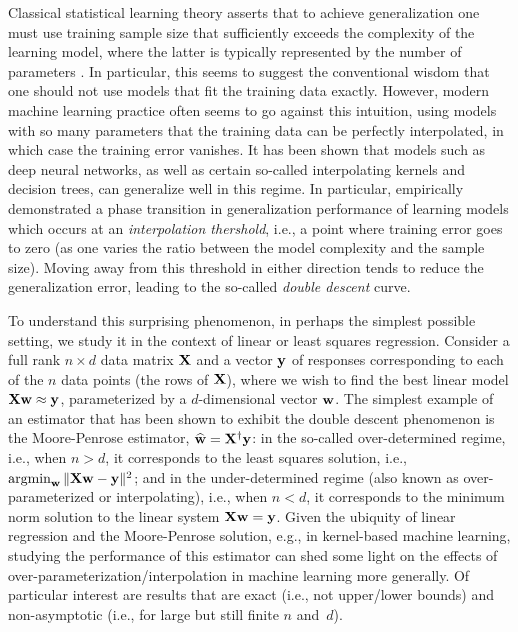 \documentclass[../../thesis.tex]{subfiles}
\begin{document}
Classical statistical learning theory asserts that to achieve generalization
one must use training sample size that sufficiently exceeds the complexity of
the learning model, where the latter is typically represented by the number of
parameters \citep[or some related structural parameter; see][]{HFT09}.  In particular,
this seems to suggest the conventional wisdom that one should not use models
that fit the training data exactly.  However, modern machine learning practice
often seems to go against this intuition, using models with so many parameters
that the training data can be perfectly interpolated, in which case the
training error vanishes. It has been shown that models such as deep neural
networks, as well as certain so-called interpolating kernels and decision
trees, can generalize well in this regime. In particular,
\cite{BHMM19} empirically demonstrated a phase transition in generalization
performance of learning models which occurs at an \emph{interpolation
  thershold}, i.e., a point where training error goes to zero (as one varies the
ratio between the model complexity and the sample size). Moving away from this
threshold in either direction tends to reduce the generalization error, leading
to the so-called \emph{double descent} curve.

To understand this
surprising phenomenon, in perhaps the simplest possible setting, we
study it in the context of linear or least squares regression.
Consider a full rank $n\times d$ data matrix $\mathbf X$ and a vector $\mathbf y$ of
responses corresponding to each of the $n$ data points (the rows of $\mathbf X$), where we wish to
find the best linear model $\mathbf X\mathbf w\approx \mathbf y$, parameterized by a
$d$-dimensional vector $\mathbf w$.
The simplest example of an estimator that has been shown to exhibit
the double descent phenomenon \citep{belkin2019two} is the
Moore-Penrose estimator, $\widehat{\mathbf w}=\mathbf X^\dagger\mathbf y$:
in the so-called over-determined regime, i.e., when $n>d$, it corresponds to the
least squares solution, i.e., $\operatorname*{\mathop{\mathrm{argmin}}}_{\mathbf w} \|\mathbf X\mathbf w-\mathbf y\|^2$; and in the
under-determined regime (also known as
over-parameterized or interpolating), i.e., when $n<d$, it
corresponds to the minimum norm solution to the linear system $\mathbf X\mathbf w=\mathbf y$.
Given the ubiquity of linear regression and the Moore-Penrose
solution, e.g., in kernel-based machine learning, studying the
performance of this estimator can shed some light on the effects of
over-parameterization/interpolation in machine learning more generally.
Of particular interest are results that are exact (i.e., not upper/lower bounds) and
non-asymptotic (i.e., for large but still finite $n$ and~$d$).
\end{document}
